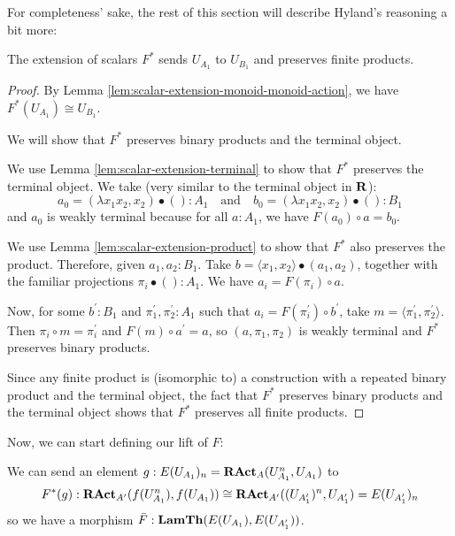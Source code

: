 For completeness' sake, the rest of this section will describe Hyland's reasoning a bit more:
\begin{lemma}
  The extension of scalars $ F^* $ sends $ U_{A_1} $ to $ U_{B_1} $ and preserves finite products.
\end{lemma}
\begin{proof}
  By Lemma \ref{lem:scalar-extension-monoid-monoid-action}, we have $ F^*(U_{A_1}) \cong U_{B_1} $.

  We will show that $ F^* $ preserves binary products and the terminal object.

  We use Lemma \ref{lem:scalar-extension-terminal} to show that $ F^* $ preserves the terminal object. We take (very similar to the terminal object in $ \mathbf{R} $):
  \[ a_0 = (\lambda x_1 x_2, x_2) \bullet () : A_1 \quad \text{and} \quad b_0 = (\lambda x_1 x_2, x_2) \bullet () : B_1 \]
  and $ a_0 $ is weakly terminal because for all $ a : A_1 $, we have $ F(a_0) \circ a = b_0 $.

  We use Lemma \ref{lem:scalar-extension-product} to show that $ F^* $ also preserves the product. Therefore, given $ a_1, a_2 : B_1 $. Take $ b = \langle x_1, x_2 \rangle \bullet (a_1, a_2) $, together with the familiar projections $ \pi_i \bullet () : A_1 $. We have $ a_i = F(\pi_i) \circ a $.

  Now, for some $ b^\prime: B_1 $ and $ \pi_1^\prime, \pi_2^\prime: A_1 $ such that $ a_i = F(\pi_i^\prime) \circ b^\prime $, take $ m = \langle \pi_1^\prime, \pi_2^\prime \rangle $. Then $ \pi_i \circ m = \pi_i^\prime $ and $ F(m) \circ a^\prime = a $, so $ (a, \pi_1, \pi_2) $ is weakly terminal and $ F^* $ preserves binary products.

  Since any finite product is (isomorphic to) a construction with a repeated binary product and the terminal object, the fact that $ F^* $ preserves binary products and the terminal object shows that $ F^* $ preserves all finite products.
\end{proof}

Now, we can start defining our lift of $ F $:
\begin{definition}
  We can send an element $ g: E(U_{A_1})_n = \mathbf{RAct}_{A}(U_{A_1}^n, U_{A_1}) $ to
  \[ F^*(g): \mathbf{RAct}_{A^\prime}(f(U_{A_1}^n), f(U_{A_1})) \cong \mathbf{RAct}_{A^\prime}((U_{A^\prime_1})^n, U_{A^\prime_1}) = E(U_{A^\prime_1})_n \]
  so we have a morphism $ \bar F: \mathbf{LamTh}(E(U_{A_1}), E(U_{A^\prime_1})) $.
\end{definition}

